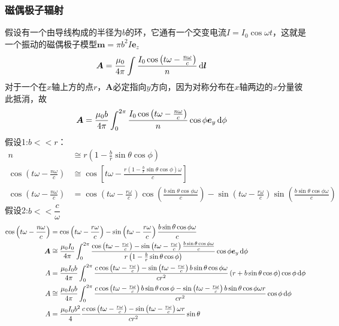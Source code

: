 \subsubsection{磁偶极子辐射}
假设有一个由导线构成的半径为$b$的环，它通有一个交变电流$I=I_0\cos\omega t$，这就是一个振动的磁偶极子模型$\boldsymbol{m}=\pi b^2I\boldsymbol{e}_z$
\begin{align}
    \boldsymbol{A}&=\frac{\mu_0}{4\pi}\int\frac{I_0\cos\left(t\omega-\frac{n\omega}{c}\right)}{n}\dif \boldsymbol{l}\nonumber
\end{align}
对于一个在$x$轴上方的点$r$，$\boldsymbol{A}$必定指向$y$方向，因为对称分布在$x$轴两边的$x$分量彼此抵消，故
\begin{align}
    \boldsymbol{A}&=\frac{\mu_0b}{4\pi}\int_0^{2\pi}\frac{I_0\cos\left(t\omega-\frac{n\omega}{c}\right)}{n}\cos\phi\boldsymbol{e}_y\dif \phi\nonumber
\end{align}
假设1:$b<<r$：
\begin{align*}
    n&\cong r\left(1-\frac{b}{r}\sin\theta\cos\phi\right)\\
    \cos\left(t\omega-\frac{n\omega}{c}\right)&\cong\cos\left[t\omega-\frac{r\left(1-\frac{b}{r}\sin\theta\cos\phi\right)\omega}{c}\right]\\
    \cos\left(t\omega-\frac{n\omega}{c}\right)&=\cos\left(t\omega-\frac{r\omega}{c}\right)\cos\left(\frac{b\sin\theta\cos\phi\omega}{c}\right)
    -\sin\left(t\omega-\frac{r\omega}{c}\right)\sin\left(\frac{b\sin\theta\cos\phi\omega}{c}\right)
\end{align*}
假设2:$b<<\dfrac{c}{\omega}$
\begin{align*}
    \cos\left(t\omega-\frac{n\omega}{c}\right)&=\cos\left(t\omega-\frac{r\omega}{c}\right)
    -\sin\left(t\omega-\frac{r\omega}{c}\right)\frac{b\sin\theta\cos\phi\omega}{c}\\
    \boldsymbol{A}&\cong\frac{\mu_0I_0}{4\pi}\int_0^{2\pi}\frac{\cos\left(t\omega-\frac{r\omega}{c}\right)
    -\sin\left(t\omega-\frac{r\omega}{c}\right)\frac{b\sin\theta\cos\phi\omega}{c}}{r\left(1-\frac{b}{r}\sin\theta\cos\phi\right)}\cos\phi\boldsymbol{e}_y\dif \phi\\
    A&=\frac{\mu_0I_0b}{4\pi }\int_0^{2\pi}\frac{
    c\cos\left(t\omega-\frac{r\omega}{c}\right)-\sin\left(t\omega-\frac{r\omega}{c}\right)b\sin\theta\cos\phi\omega}{cr^2}\left(r+b\sin\theta\cos\phi\right)\cos\phi\dif \phi\\
    A&\cong\frac{\mu_0I_0b}{4\pi }\int_0^{2\pi}\frac{
    c\cos\left(t\omega-\frac{r\omega}{c}\right)b\sin\theta\cos\phi-\sin\left(t\omega-\frac{r\omega}{c}\right)b\sin\theta\cos\phi\omega r}{cr^2}\cos\phi\dif \phi\\
    A&=\frac{\mu_0I_0b^2}{4}\frac{
    c\cos\left(t\omega-\frac{r\omega}{c}\right)-\sin\left(t\omega-\frac{r\omega}{c}\right)\omega r}{cr^2}\sin\theta
\end{align*}
